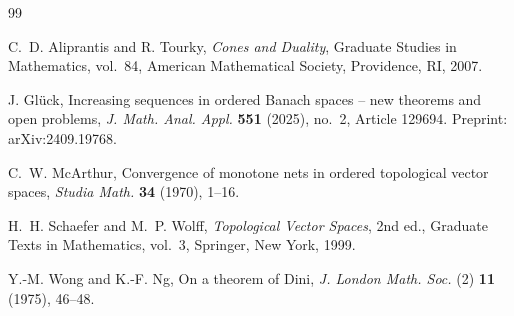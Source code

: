 \documentclass[11pt]{article}
\theoremstyle{remark}
\begin{document}
\begin{thebibliography}{99}

C.~D. Aliprantis and R. Tourky,
\emph{Cones and Duality},
Graduate Studies in Mathematics, vol.~84,
American Mathematical Society, Providence, RI, 2007.

J. Gl\"uck,
Increasing sequences in ordered Banach spaces -- new theorems and open
problems,
\emph{J. Math. Anal. Appl.} \textbf{551} (2025), no.~2, Article 129694.
Preprint: arXiv:2409.19768.

C.~W. McArthur,
Convergence of monotone nets in ordered topological vector spaces,
\emph{Studia Math.} \textbf{34} (1970), 1--16.

H.~H. Schaefer and M.~P. Wolff,
\emph{Topological Vector Spaces},
2nd ed., Graduate Texts in Mathematics, vol.~3,
Springer, New York, 1999.

Y.-M. Wong and K.-F. Ng,
On a theorem of Dini,
\emph{J. London Math. Soc.} (2) \textbf{11} (1975), 46--48.

\end{thebibliography}
\end{document}
